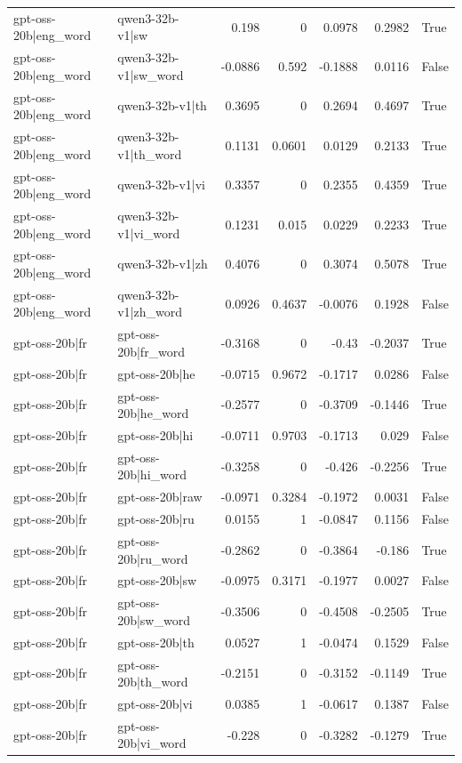 \begin{table}
\begin{tabular}{l l r r r r l}
gpt-oss-20b|eng_word & qwen3-32b-v1|sw & 0.198 & 0 & 0.0978 & 0.2982 & True \\
gpt-oss-20b|eng_word & qwen3-32b-v1|sw_word & -0.0886 & 0.592 & -0.1888 & 0.0116 & False \\
gpt-oss-20b|eng_word & qwen3-32b-v1|th & 0.3695 & 0 & 0.2694 & 0.4697 & True \\
gpt-oss-20b|eng_word & qwen3-32b-v1|th_word & 0.1131 & 0.0601 & 0.0129 & 0.2133 & True \\
gpt-oss-20b|eng_word & qwen3-32b-v1|vi & 0.3357 & 0 & 0.2355 & 0.4359 & True \\
gpt-oss-20b|eng_word & qwen3-32b-v1|vi_word & 0.1231 & 0.015 & 0.0229 & 0.2233 & True \\
gpt-oss-20b|eng_word & qwen3-32b-v1|zh & 0.4076 & 0 & 0.3074 & 0.5078 & True \\
gpt-oss-20b|eng_word & qwen3-32b-v1|zh_word & 0.0926 & 0.4637 & -0.0076 & 0.1928 & False \\
gpt-oss-20b|fr & gpt-oss-20b|fr_word & -0.3168 & 0 & -0.43 & -0.2037 & True \\
gpt-oss-20b|fr & gpt-oss-20b|he & -0.0715 & 0.9672 & -0.1717 & 0.0286 & False \\
gpt-oss-20b|fr & gpt-oss-20b|he_word & -0.2577 & 0 & -0.3709 & -0.1446 & True \\
gpt-oss-20b|fr & gpt-oss-20b|hi & -0.0711 & 0.9703 & -0.1713 & 0.029 & False \\
gpt-oss-20b|fr & gpt-oss-20b|hi_word & -0.3258 & 0 & -0.426 & -0.2256 & True \\
gpt-oss-20b|fr & gpt-oss-20b|raw & -0.0971 & 0.3284 & -0.1972 & 0.0031 & False \\
gpt-oss-20b|fr & gpt-oss-20b|ru & 0.0155 & 1 & -0.0847 & 0.1156 & False \\
gpt-oss-20b|fr & gpt-oss-20b|ru_word & -0.2862 & 0 & -0.3864 & -0.186 & True \\
gpt-oss-20b|fr & gpt-oss-20b|sw & -0.0975 & 0.3171 & -0.1977 & 0.0027 & False \\
gpt-oss-20b|fr & gpt-oss-20b|sw_word & -0.3506 & 0 & -0.4508 & -0.2505 & True \\
gpt-oss-20b|fr & gpt-oss-20b|th & 0.0527 & 1 & -0.0474 & 0.1529 & False \\
gpt-oss-20b|fr & gpt-oss-20b|th_word & -0.2151 & 0 & -0.3152 & -0.1149 & True \\
gpt-oss-20b|fr & gpt-oss-20b|vi & 0.0385 & 1 & -0.0617 & 0.1387 & False \\
gpt-oss-20b|fr & gpt-oss-20b|vi_word & -0.228 & 0 & -0.3282 & -0.1279 & True \\

\end{tabular}
\end{table}
